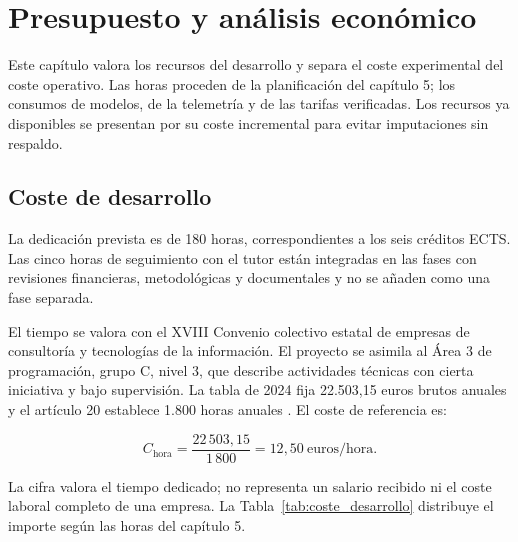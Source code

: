 \chapter{Presupuesto y análisis económico}
\label{cap:presupuesto}

Este capítulo valora los recursos del desarrollo y separa el coste experimental del coste operativo. Las horas proceden de la planificación del capítulo 5; los consumos de modelos, de la telemetría y de las tarifas verificadas. Los recursos ya disponibles se presentan por su coste incremental para evitar imputaciones sin respaldo.

\section{Coste de desarrollo}
\label{sec:coste_desarrollo}

La dedicación prevista es de 180 horas, correspondientes a los seis créditos ECTS. Las cinco horas de seguimiento con el tutor están integradas en las fases con revisiones financieras, metodológicas y documentales y no se añaden como una fase separada.

El tiempo se valora con el XVIII Convenio colectivo estatal de empresas de consultoría y tecnologías de la información. El proyecto se asimila al Área 3 de programación, grupo C, nivel 3, que describe actividades técnicas con cierta iniciativa y bajo supervisión. La tabla de 2024 fija 22.503,15 euros brutos anuales y el artículo 20 establece 1.800 horas anuales \citep{boe2023consultoria}. El coste de referencia es:

\begin{equation}
C_{\text{hora}}
=
\frac{22\,503{,}15}{1\,800}
=
12{,}50\ \text{euros/hora}.
\end{equation}

La cifra valora el tiempo dedicado; no representa un salario recibido ni el coste laboral completo de una empresa. La Tabla~\ref{tab:coste_desarrollo} distribuye el importe según las horas del capítulo 5.

